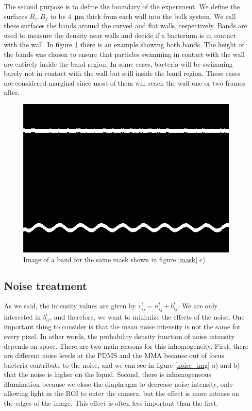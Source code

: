 The second purpose is to define the boundary of the experiment. We define the surfaces $B_{c},B_{f}$ to be \SI{4}{\micro\meter} thick from each wall into the bulk system. We call these surfaces the bands around the curved and flat walls, respectively.  Bands are used to measure the density near walls and decide if a bacterium is in contact with the wall.  In figure \ref{bands} there is an example showing both bands. The height of the bands was chosen to ensure that particles swimming in contact with the wall are entirely inside the band region. In some cases, bacteria will be swimming barely not in contact with the wall but still inside the band region. These cases are considered marginal since most of them will reach the wall one or two frames after.

\begin{figure}
\centering
\includegraphics[width=\linewidth,angle=0]{imagenes/bandas22.10.21_A=3_L=21.png}
\caption[Bands example]{Image of a band for the same mask shown in figure \ref{mask} c).}
\label{bands}
\end{figure}

\subsection{Noise treatment}

As we said, the intensity values are given by $v_{ij}^t  = n_{ij}^t +  b_{ij}^t$. We are only interested in $b_{ij}^t$, and therefore, we want to minimize the effects of the noise. One important thing to consider is that the mean noise intensity is not the same for every pixel. In other words, the probability density function of noise intensity depends on space. There are two main reasons for this inhomogeneity. First, there are different noise levels at the PDMS and the MMA because out of focus bacteria contribute to the noise, and we can see in figure \ref{noise_img} a) and b) that the noise is higher on the liquid. Second, there is inhomogeneous illumination because we close the diaphragm to decrease noise intensity, only allowing light in the ROI to enter the camera, but the effect is more intense on the edges of the image. This effect is often less important than the first.

